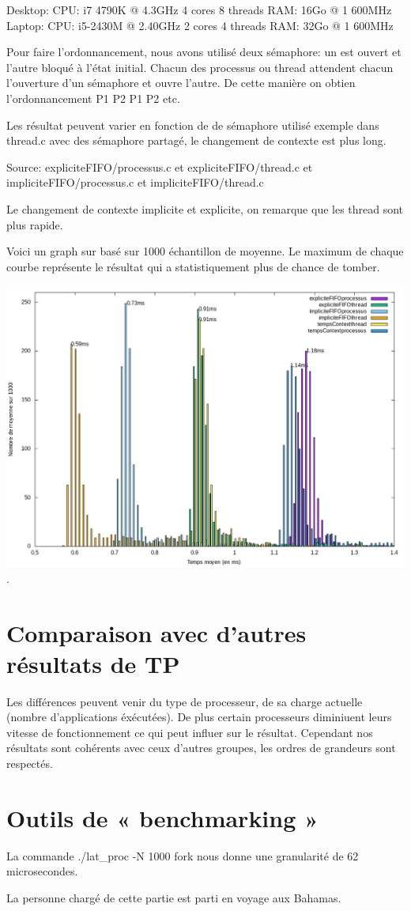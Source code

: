 \documentclass[12pt]{article}
\begin{document}
Desktop: CPU: i7 4790K @ 4.3GHz 4 cores 8 threads RAM: 16Go @ 1 600MHz
Laptop: CPU: i5-2430M @ 2.40GHz 2 cores 4 threads RAM: 32Go @ 1 600MHz

Pour faire l'ordonnancement, nous avons utilisé deux sémaphore: un est ouvert
et l'autre bloqué à l'état initial. Chacun des processus ou thread attendent
chacun l'ouverture d'un sémaphore et ouvre l'autre. De cette manière on obtien
l'ordonnancement P1 P2 P1 P2 etc.

Les résultat peuvent varier en fonction de de sémaphore utilisé exemple
dans thread.c avec des sémaphore partagé, le changement de contexte est plus
long.


Source: expliciteFIFO/processus.c et expliciteFIFO/thread.c et  impliciteFIFO/processus.c et impliciteFIFO/thread.c  

Le changement de contexte implicite et explicite, on remarque que les thread sont plus rapide.

Voici un graph sur basé sur 1000 échantillon de moyenne. 
Le maximum de chaque courbe représente le résultat qui a statistiquement plus de chance de tomber.

\includegraphics[width=\linewidth]{graph.png}.

\section{Comparaison avec d'autres résultats de TP}

Les différences peuvent venir du type de processeur, de sa charge actuelle (nombre d'applications éxécutées).
De plus certain processeurs diminiuent leurs vitesse de fonctionnement ce qui peut influer sur le résultat.
Cependant nos résultats sont cohérents avec ceux d'autres groupes, les ordres de grandeurs sont respectés.

\section{Outils de « benchmarking »}
La commande ./lat\_proc -N 1000 fork nous donne une granularité de 62 microsecondes. \newline

La personne chargé de cette partie est parti en voyage aux Bahamas.
\end{document}
